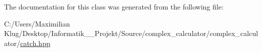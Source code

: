 The documentation for this class was generated from the following file\+:\begin{DoxyCompactItemize}
\item 
C\+:/\+Users/\+Maximilian Klug/\+Desktop/\+Informatik\+\_\+\_\+\+Projekt/\+Source/complex\+\_\+calculator/complex\+\_\+calculator/\mbox{\hyperlink{catch_8hpp}{catch.\+hpp}}\end{DoxyCompactItemize}
